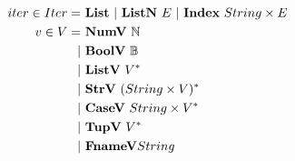 \begin{align*}
%
  iter \in Iter =& ~ \listiter ~ | ~ \listniter ~ E ~|~ \listidxiter ~ String \times E \\
%
  v \in V =& ~ \numv ~ \mathbb N \\
    | & ~ \boolv ~ \mathbb B \\
    | & ~ \listv ~ \seq V \\
    | & ~ \strv ~ \seq{(String \times V)} \\
    | & ~ \casev ~ String \times \seq V \\
    | & ~ \tupv ~ \seq V \\
    | & ~ \fnamev String \\
\end{align*}





\newpage

